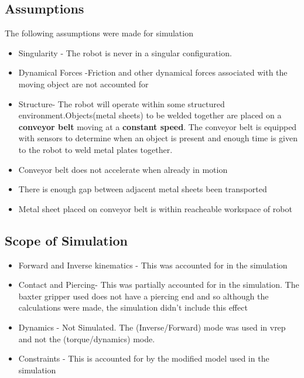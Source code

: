 \documentclass[12pt]{article}
\begin{document}
  \subsection{Assumptions}
  The following assumptions were made for simulation
  \begin{itemize}
    \item Singularity - The robot is never in a singular configuration. 
    \item Dynamical Forces  -Friction  and other dynamical forces associated with the moving object are not accounted for 
    \item Structure- The robot will operate within some structured environment.Objects(metal sheets) to be welded together
      are placed on a \textbf{conveyor belt} moving at a \textbf{constant speed}. The conveyor belt is equipped with sensors 
      to determine when an object is present and enough time is given to the robot to weld metal plates together.
    \item Conveyor belt does not accelerate when already in motion 
    \item There is enough gap between adjacent metal sheets been transported
    \item Metal sheet placed on conveyor belt is within reacheable workspace of robot
  \end{itemize}

  \subsection{Scope of Simulation}
  \begin{itemize}
    \item Forward and Inverse kinematics -  This was accounted for in the simulation
    \item Contact and Piercing- This was partially accounted for in the simulation. The baxter gripper used 
     does not have a piercing end and so although the calculations were made, the simulation didn't include this effect 
   \item Dynamics - Not Simulated. The (Inverse/Forward) mode was used in vrep and not the (torque/dynamics) mode.
   \item Constraints - This is accounted for by the modified model used in the simulation
  \end{itemize}
  
\end{document}
